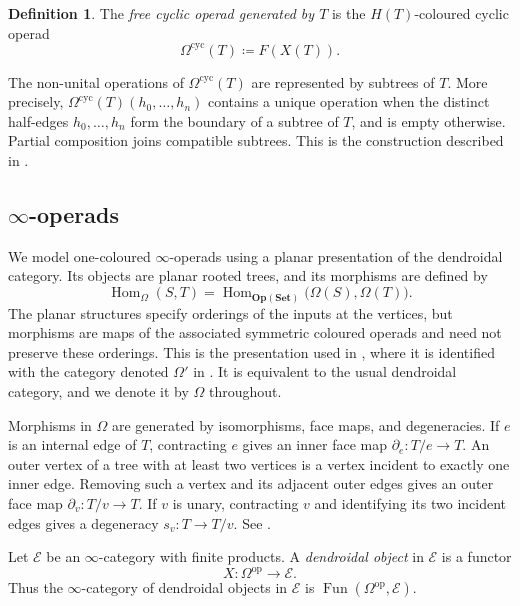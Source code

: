 \documentclass{amsart}
\newcommand{\Set}{\mathbf{Set}}
\newcommand{\Op}{\mathbf{Op}}
\newcommand{\Hom}{\operatorname{Hom}}
\theoremstyle{definition}
\newtheorem{definition}[theorem]{Definition}%
\numberwithin{equation}{section}
\begin{document}
\begin{definition}
\label{def: free cyclic operad generated by a tree}
The \emph{free cyclic operad generated by $T$} is the
$H(T)$-coloured cyclic operad
\[
\Omega^{\mathrm{cyc}}(T)\coloneqq F(X(T)).
\]
\end{definition}

The non-unital operations of $\Omega^{\mathrm{cyc}}(T)$ are represented by
subtrees of $T$. More precisely,
$\Omega^{\mathrm{cyc}}(T)(h_0,\ldots,h_n)$ contains a unique
operation when the distinct half-edges $h_0,\ldots,h_n$ form the
boundary of a subtree of $T$, and is empty otherwise. Partial
composition joins compatible subtrees. This is the construction
described in
\cite[Definitions~4.6 and~4.8]{doherty2025models}.

\subsection{\texorpdfstring{$\infty$}{infinity}-operads}
\label{subsec: infinity operad}

We model one-coloured $\infty$-operads using a planar presentation of
the dendroidal category. Its objects are planar rooted trees, and its
morphisms are defined by
\[
\Hom_{\Omega}(S,T)
=
\Hom_{\Op(\Set)}\bigl(\Omega(S),\Omega(T)\bigr).
\]
The planar structures specify orderings of the inputs at the vertices,
but morphisms are maps of the associated symmetric coloured operads
and need not preserve these orderings. This is the presentation used
in \cite[p.~235]{hackney_config}, where it is identified with the
category denoted $\Omega'$ in
\cite[Example~2.8]{bm_reedy}. It is equivalent to the usual dendroidal
category, and we denote it by $\Omega$ throughout.

Morphisms in $\Omega$ are generated by isomorphisms, face maps, and
degeneracies. If $e$ is an internal edge of $T$, contracting $e$
gives an inner face map $\partial_e\colon T/e\to T$. An outer vertex
of a tree with at least two vertices is a vertex incident to exactly
one inner edge. Removing such a vertex and its adjacent outer edges
gives an outer face map $\partial_v\colon T/v\to T$. If $v$ is unary,
contracting $v$ and identifying its two incident edges gives a
degeneracy $s_v\colon T\to T/v$. See
\cite{MW1,moerdijk_lectures,HM}.

Let $\mathcal E$ be an $\infty$-category with finite products. A
\emph{dendroidal object} in $\mathcal E$ is a functor
\[
X\colon\Omega^{\mathrm{op}}\longrightarrow\mathcal E.
\]
Thus the $\infty$-category of dendroidal objects in $\mathcal E$ is
$\operatorname{Fun}(\Omega^{\mathrm{op}},\mathcal E)$.
\end{document}
